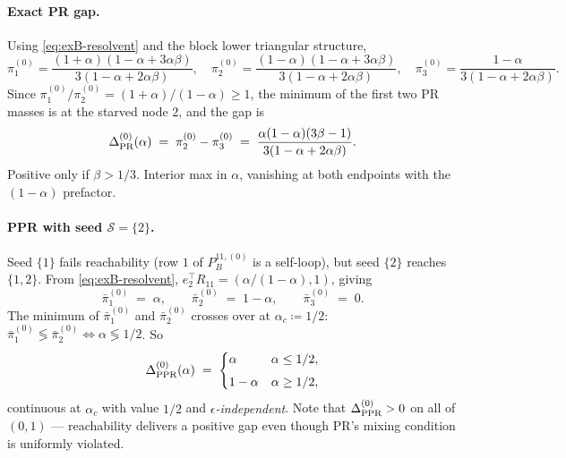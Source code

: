 \documentclass{article}
\theoremstyle{plain}
\theoremstyle{definition}
\def\tp{\intercal}
\newcommand{\arXivtag}[1][]{#1}
\begin{document}
\paragraph{Exact PR gap.} Using \eqref{eq:exB-resolvent} and the block lower triangular structure,
	\[
	\pi^{(0)}_1 = \frac{(1+\alpha)(1-\alpha+3\alpha\beta)}{3(1-\alpha+2\alpha\beta)}, \quad \pi^{(0)}_2 = \frac{(1-\alpha)(1-\alpha+3\alpha\beta)}{3(1-\alpha+2\alpha\beta)}, \quad \pi^{(0)}_3 = \frac{1-\alpha}{3(1-\alpha+2\alpha\beta)}.
	\]
	Since $\pi^{(0)}_1/\pi^{(0)}_2 = (1+\alpha)/(1-\alpha) \geq 1$, \arXivtag[the minimum of the first two PR masses] is at the starved node $2$, and the gap is
	\begin{equation}\label{eq:exB-PR-gap}
		\Delta^{(0)}_{\textnormal{PR}}(\alpha) \;=\; \pi^{(0)}_2 - \pi^{(0)}_3 \;=\; \frac{\alpha(1-\alpha)(3\beta-1)}{3(1-\alpha+2\alpha\beta)}.
	\end{equation}
	Positive only if $\beta > 1/3$. Interior max in $\alpha$, vanishing at both endpoints with the $(1-\alpha)$ prefactor.

\paragraph{PPR with seed $\mathcal{S} = \{2\}$.} Seed $\{1\}$ fails reachability (row $1$ of $P^{11,(0)}_B$ is a self-loop), but seed $\{2\}$ reaches $\{1,2\}$. From \eqref{eq:exB-resolvent}, $e_2^\tp R_{11} = (\alpha/(1-\alpha), 1)$, giving
	\[
	\bar\pi^{(0)}_1 \;=\; \alpha, \qquad \bar\pi^{(0)}_2 \;=\; 1-\alpha, \qquad \bar\pi^{(0)}_3 \;=\; 0.
	\]
	The \arXivtag[minimum of $\bar\pi^{(0)}_1$ and $\bar\pi^{(0)}_2$] crosses over at $\alpha_c \coloneqq 1/2$: $\bar\pi^{(0)}_1 \lessgtr \bar\pi^{(0)}_2 \Leftrightarrow \alpha \lessgtr 1/2$. So
	\begin{equation}\label{eq:exB-PPR-gap}
		\Delta^{(0)}_{\textnormal{PPR}}(\alpha) \;=\; \begin{cases} \alpha & \alpha \leq 1/2,\\[4pt] 1-\alpha & \alpha \geq 1/2, \end{cases}
	\end{equation}
	continuous at $\alpha_c$ with value $1/2$ and \emph{$\epsilon$-independent}. Note that $\Delta^{(0)}_{\textnormal{PPR}} > 0$ on all of $(0,1)$ --- reachability delivers a positive gap even though PR's mixing condition is uniformly violated.
\end{document}
